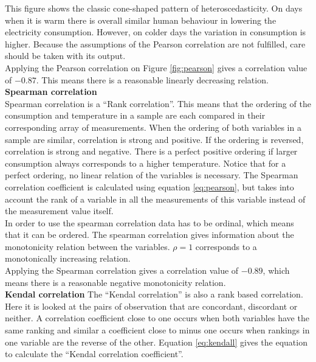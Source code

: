 This figure shows the classic cone-shaped pattern of heteroscedasticity. On days when it is warm there is overall similar human behaviour in lowering the electricity consumption. However, on colder days the variation in consumption is higher. Because the assumptions of the Pearson correlation are not fulfilled, care should be taken with its output.\\

Applying the Pearson correlation on Figure \ref{fig:pearson} gives a correlation value of $ -0.87 $. This means there is a reasonable linearly decreasing relation.\\


\textbf{Spearman correlation}\\
Spearman correlation is a ``Rank correlation''. This means that the ordering of the consumption and temperature in a sample are each compared in their corresponding array of measurements.  When the ordering of both variables in a sample are similar, correlation is strong and positive. If the ordering is reversed, correlation is strong and negative. There is a perfect positive ordering if larger consumption always corresponds to a higher temperature. Notice that for a perfect ordering, no linear relation of the variables is necessary. The Spearman correlation coefficient is calculated using equation \ref{eq:pearson}, but takes into account the rank of a variable in all the measurements of this variable instead of the measurement value itself.\\

In order to use the spearman correlation data has to be ordinal, which means that it can be ordered. The spearman correlation gives information about the monotonicity relation between the variables. $ \rho = 1 $ corresponds to a monotonically increasing relation.\\

Applying the Spearman correlation  gives a correlation value of $ -0.89$, which means there is a reasonable negative monotonicity relation.\\

\textbf{Kendal correlation}
The ``Kendal correlation'' is also a rank based correlation. Here it is looked at the pairs of observation that are concordant, discordant or neither. A correlation coefficient close to one occurs when both variables have the same ranking and similar a coefficient close to minus one occurs when rankings in one variable are the reverse of the other. Equation \ref{eq:kendall} gives the equation to calculate the ``Kendal correlation coefficient''.

